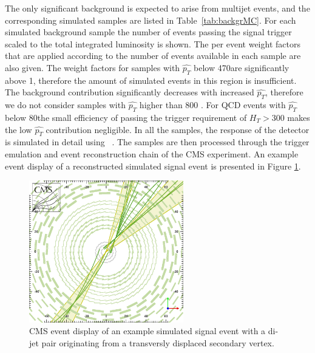 The only significant background is expected to arise from multijet events, and the corresponding simulated samples
are listed in Table~\ref{tab:backgrMC}.
For each simulated background sample the number of events passing the signal trigger
scaled to the total integrated luminosity is shown. The per event weight factors that are applied according to the
number of events available in each sample are also given. The weight factors for samples with $\hat{p_T}$ 
below 470\GeVc are significantly above 1, therefore the amount of simulated events in this region is insufficient. 
The background contribution   
significantly decreases with increased $\hat{p_T}$, therefore we do not consider samples with $\hat{p_T}$ higher
than 800 \GeVc. For QCD events with $\hat{p_T}$ below 80\GeVc the small efficiency of passing the trigger
 requirement of $H_T>$300\GeVc 
makes the low $\hat{p_T}$ contribution negligible.  
In all the samples, the response of the detector is simulated
in detail using \GEANTfour~\cite{GEANT4}. The samples are then processed through the trigger emulation and
event reconstruction chain of the CMS experiment. An example event display of a reconstructed 
simulated signal event is presented in Figure \ref{fig:eventDisplay}.

\begin{figure}[htbp]
\centering
 \includegraphics[width=0.6\textwidth]{plots/eventDisplay.png}
\caption{CMS event display of an example simulated signal event with a di-jet pair originating from a transversly displaced secondary vertex. \label{fig:eventDisplay}}
\end{figure}
 
